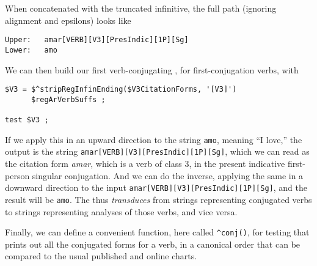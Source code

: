 \noindent
When concatenated with the truncated infinitive, the full path (ignoring alignment and epsilons) looks like

\begin{Verbatim}
Upper:   amar[VERB][V3][PresIndic][1P][Sg]
Lower:   amo
\end{Verbatim}

We can then build our first verb-conjugating \fsm{}, for first-conjugation verbs,  with


\begin{Verbatim}
$V3 = $^stripRegInfinEnding($V3CitationForms, '[V3]')
      $regArVerbSuffs ;

test $V3 ;
\end{Verbatim}


If we apply this \fsm{} in an upward direction to the string \texttt{amo}, meaning
``I love,'' the output is the string \texttt{amar[VERB][V3][PresIndic][1P][Sg]},
which we can read as the citation form \emph{amar}, which is a verb of
class 3, in the present indicative first-person singular conjugation.
And we can do the inverse, applying the same \fsm{} in a downward direction to
the input \texttt{amar[VERB][V3][PresIndic][1P][Sg]}, and the result will be
\texttt{amo}.  The \fsm{} thus \emph{transduces} from strings representing conjugated
verbs to strings representing analyses of those verbs, and vice versa.

Finally, we can define a convenient function, here called \verb!^conj()!, for testing that prints out all the conjugated forms for a
verb, in a canonical order that can be compared to the usual published and
online charts.


